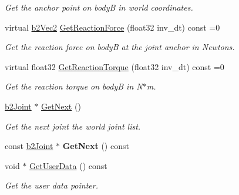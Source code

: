 \begin{DoxyCompactItemize}
\begin{DoxyCompactList}\small\item\em Get the anchor point on bodyB in world coordinates. \end{DoxyCompactList}\item 
\mbox{\label{classb2Joint_a7e0eddefb9b69ad050b8ef6425838a74}} 
virtual \mbox{\hyperlink{structb2Vec2}{b2\+Vec2}} \mbox{\hyperlink{classb2Joint_a7e0eddefb9b69ad050b8ef6425838a74}{Get\+Reaction\+Force}} (float32 inv\+\_\+dt) const =0
\begin{DoxyCompactList}\small\item\em Get the reaction force on bodyB at the joint anchor in Newtons. \end{DoxyCompactList}\item 
\mbox{\label{classb2Joint_ae355e441c2aa842777dc04e24f15ced0}} 
virtual float32 \mbox{\hyperlink{classb2Joint_ae355e441c2aa842777dc04e24f15ced0}{Get\+Reaction\+Torque}} (float32 inv\+\_\+dt) const =0
\begin{DoxyCompactList}\small\item\em Get the reaction torque on bodyB in N$\ast$m. \end{DoxyCompactList}\item 
\mbox{\label{classb2Joint_a1a0e2137b631010750c728cb4e276e5d}} 
\mbox{\hyperlink{classb2Joint}{b2\+Joint}} $\ast$ \mbox{\hyperlink{classb2Joint_a1a0e2137b631010750c728cb4e276e5d}{Get\+Next}} ()
\begin{DoxyCompactList}\small\item\em Get the next joint the world joint list. \end{DoxyCompactList}\item 
\mbox{\label{classb2Joint_aac18301414d6ca0a20aefb471c709e78}} 
const \mbox{\hyperlink{classb2Joint}{b2\+Joint}} $\ast$ {\bfseries Get\+Next} () const
\item 
\mbox{\label{classb2Joint_a798c593c7a4958d408bca10f3b3788f9}} 
void $\ast$ \mbox{\hyperlink{classb2Joint_a798c593c7a4958d408bca10f3b3788f9}{Get\+User\+Data}} () const
\begin{DoxyCompactList}\small\item\em Get the user data pointer. \end{DoxyCompactList}\item 

\end{DoxyCompactItemize}
